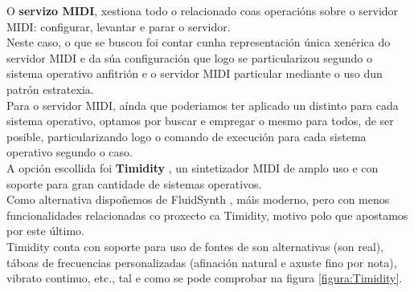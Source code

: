    O \textbf{servizo MIDI}, xestiona todo o relacionado coas operacións sobre o
   servidor MIDI: configurar, levantar e parar o servidor. \\
   
   Neste caso, o que se buscou foi contar cunha representación única xenérica do
   servidor MIDI e da súa configuración que logo se particularizou segundo o
   sistema operativo anfitrión e o servidor MIDI particular mediante o uso dun
   patrón estratexia. \\
   
   Para o servidor MIDI, aínda que poderiamos ter aplicado un distinto para cada
   sistema operativo, optamos por buscar e empregar o mesmo para todos, de ser
   posible, particularizando logo o comando de execución para cada sistema
   operativo segundo o caso. \\
   
   A opción escollida foi \textbf{Timidity} \cite{Timidity}, un sintetizador
   MIDI de amplo uso e con soporte para gran cantidade de sistemas
   operativos. \\
   
   Como alternativa dispoñemos de FluidSynth \cite{FluidSynth}, máis moderno,
   pero con menos funcionalidades relacionadas co proxecto ca Timidity, motivo
   polo que apostamos por este último. \\
   
   Timidity conta con soporte para uso de fontes de son alternativas (son real),
   táboas de frecuencias personalizadas (afinación natural e axuste fino por
   nota), vibrato continuo, etc., tal e como se pode comprobar na figura
   \ref{figura:Timidity}. \\
   

